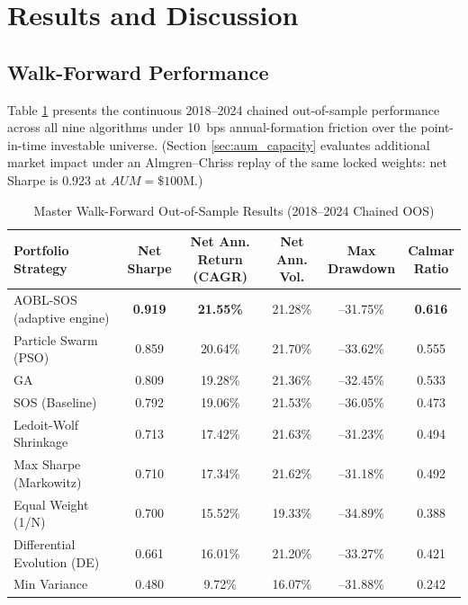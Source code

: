 \documentclass[11pt,a4paper]{article}
\begin{document}
\section{Results and Discussion}

\subsection{Walk-Forward Performance}
\label{sec:wf_performance}
Table \ref{tab:master_wf} presents the continuous 2018--2024 chained out-of-sample performance across all nine algorithms under 10~bps annual-formation friction over the point-in-time investable universe. (Section \ref{sec:aum_capacity} evaluates additional market impact under an Almgren--Chriss replay of the same locked weights: net Sharpe is 0.923 at $AUM = \$100\text{M}$.)

\begin{table}[htbp]
\centering
\caption{Master Walk-Forward Out-of-Sample Results (2018--2024 Chained OOS)}
\label{tab:master_wf}
\hspace*{-0.9cm}
\begin{tabular}{lccccc}
\toprule
\textbf{Portfolio Strategy} &
\makecell{\textbf{Net}\\\textbf{Sharpe}} &
\makecell{\textbf{Net Ann.}\\\textbf{Return (CAGR)}} &
\makecell{\textbf{Net Ann.}\\\textbf{Vol.}} &
\makecell{\textbf{Max}\\\textbf{Drawdown}} &
\makecell{\textbf{Calmar}\\\textbf{Ratio}} \\
\midrule
AOBL-SOS (adaptive engine) & \textbf{0.919} & \textbf{21.55\%} & 21.28\% & --31.75\% & \textbf{0.616} \\
Particle Swarm (PSO) & 0.859 & 20.64\% & 21.70\% & --33.62\% & 0.555 \\
GA & 0.809 & 19.28\% & 21.36\% & --32.45\% & 0.533 \\
SOS (Baseline) & 0.792 & 19.06\% & 21.53\% & --36.05\% & 0.473 \\
Ledoit-Wolf Shrinkage & 0.713 & 17.42\% & 21.63\% & --31.23\% & 0.494 \\
Max Sharpe (Markowitz) & 0.710 & 17.34\% & 21.62\% & --31.18\% & 0.492 \\
Equal Weight (1/N) & 0.700 & 15.52\% & 19.33\% & --34.89\% & 0.388 \\
Differential Evolution (DE) & 0.661 & 16.01\% & 21.20\% & --33.27\% & 0.421 \\
Min Variance & 0.480 & 9.72\% & 16.07\% & --31.88\% & 0.242 \\
\bottomrule
\end{tabular}
\end{table}
\end{document}
